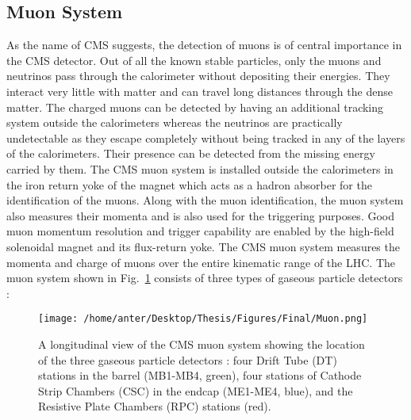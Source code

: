 \subsection{Muon System}
As the name of CMS suggests, the detection of muons is of central importance in the CMS detector. Out of all the known stable particles, only the muons and neutrinos pass through the calorimeter without depositing their energies. They interact very little with matter and can travel long distances through the dense matter. The charged muons can be detected by having an additional tracking system outside the calorimeters whereas the neutrinos are practically undetectable as they escape completely without being tracked in any of the layers of the calorimeters. Their presence can be detected from the missing energy carried by them. The CMS muon system is installed outside the calorimeters in the iron return yoke of the magnet which acts as a hadron absorber for the identification of the muons. Along with the muon identification, the muon system also measures their momenta and is also used for the triggering purposes. Good muon momentum resolution and trigger capability are enabled by the high-field solenoidal magnet and its flux-return yoke. The CMS muon system measures the momenta and charge of muons over the entire kinematic range of the LHC. The muon system shown in Fig.~\ref{fig:muon} consists of three types of gaseous particle detectors : \\ \newline
\begin{figure}[!t]
\begin{center}
\vspace*{3mm} 
\hspace*{-5mm}
\texttt{[image: /home/anter/Desktop/Thesis/Figures/Final/Muon.png]}\\
\vspace*{4mm}
\caption[A longitudinal view of the CMS muon system showing the location of the three gaseous particle detectors.]{A longitudinal view of the CMS muon system showing the location of the three gaseous particle detectors : four Drift Tube (DT) stations in the barrel (MB1-MB4, green), four stations of Cathode Strip Chambers (CSC) in the endcap (ME1-ME4, blue), and the Resistive Plate Chambers (RPC) stations (red)\footnotemark.}
\label{fig:muon}
\end{center}
\end{figure}
